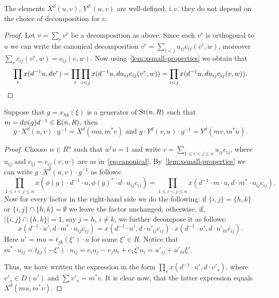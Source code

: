 \begin{lemma}
    \label{lem:xy-wd}
    The elements $X^d(u, v)$, $Y^{d'}(u, v)$ are well-defined, i.\,e. they do not depend on the choice of decomposition for $v$.
\end{lemma}
\begin{proof}
    Let $v = \sum_r v^r$ be a decomposition as above.
    Since each $v^r$ is orthogonal to $u$ we can write the canonical decomposition
    $v^r = \sum_{i<j} u_{ij} c_{ij}(v^r, w)$, moreover $\sum_{r} c_{ij}(v^r, w) = c_{ij}(v, w)$.
    Now using~\cref{lem:xsmall-properties} we obtain that
    \begin{multline*}
        \prod\limits_r x(d^{-1}u, dv^r) = \prod\limits_{r}\prod\limits_{i<j} x(d^{-1} u, du_{ij}c_{ij}(v^r, w)) =
        \prod\limits_{i<j} x(d^{-1} u, d u_{ij}c_{ij}(v, w)). \qedhere
    \end{multline*}
\end{proof}

\begin{lemma}
    \label{lem:xy-conj} Suppose that $g = x_{hk}(\xi)$ is a generator of $\operatorname{St}(n, R)$ such that $m = d\phi(g)d^{-1} \in \operatorname{E}(n, R)$, then
    \begin{equation*}
        g \cdot X^d(u, v) \cdot g^{-1} = X^d(mu, m^*v) \text{ and } g \cdot Y^d(v, u) \cdot g^{-1} = Y^d(mv, m^*u).
    \end{equation*}
\end{lemma}
\begin{proof}
 Choose $w\in R^n$ such that $w^t u = 1$ and write $v = \sum_{1\leq i<j\leq n} u_{ij} c_{ij}$, where $u_{ij}$ and $c_{ij} = c_{ij}(v, w)$ are as in~\eqref{eq:canonical}.
 By~\cref{lem:xsmall-properties} we can write $g \cdot X^d(u, v) \cdot g^{-1}$ as follows:
 \begin{equation} \nonumber
   \prod\limits_{1\leq i<j\leq n} x(\phi(g) \cdot d^{-1} \cdot u, \phi(g)^* \cdot d \cdot u_{ij}c_{ij})
 = \prod\limits_{1\leq i<j\leq n} x( d^{-1} \cdot m \cdot u, d \cdot m^* \cdot u_{ij}c_{ij}).
 \end{equation}
 Now for every factor in the right-hand side we do the following:
 if $\{i, j\} = \{h, k\}$ or $\{i, j\} \cap \{h, k\} = \emptyset$ we leave the factor unchanged,
 otherwise, if, $|\{i, j\} \cap \{h, k\}| = 1$,  say $j = h$, $i\neq k$, we further decompose it as follows:
  \begin{equation} \nonumber
     x(d^{-1} \cdot u', d \cdot m^* \cdot u_{ij} c_{ij}) =
     x(d^{-1} \cdot u', d \cdot u'_{ij} c_{ij}) \cdot
     x(d^{-1} \cdot u', d \cdot u'_{ki} c_{ij}).
  \end{equation}
  Here $u' = m  u = t_{jk}(\xi') \cdot u$ for some $\xi' \in R$.
  Notice that $m^* \cdot u_{ij} = t_{kj}(-\xi') \cdot u_{ij} = e_iu_j - e_ju_i + e_k\xi'u_i =u'_{ij}+u'_{ki}\xi'$.

  Thus, we have written the expression in the form $\prod_{s} x(d^{-1} \cdot u', d \cdot v'_s) $, where $v'_s \in D(u')$ and
   $\sum v'_s = m^*v$. It is clear now, that the latter expression equals $X^d(m u, m^* v)$.
\end{proof}
